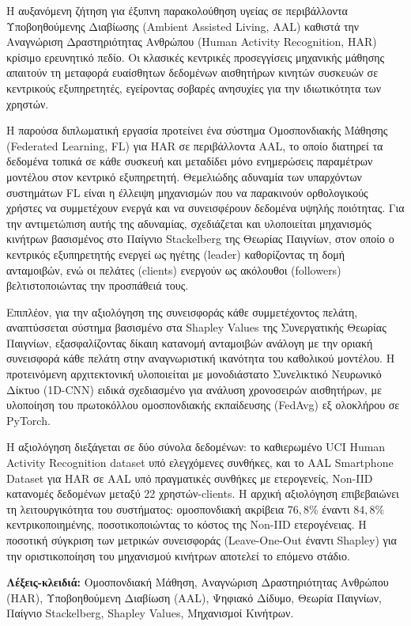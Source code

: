 
\noindent
Η αυξανόμενη ζήτηση για έξυπνη παρακολούθηση υγείας σε περιβάλλοντα
Υποβοηθούμενης Διαβίωσης (Ambient Assisted Living, AAL) καθιστά την
Αναγνώριση Δραστηριότητας Ανθρώπου (Human Activity Recognition, HAR)
κρίσιμο ερευνητικό πεδίο. Οι κλασικές κεντρικές προσεγγίσεις μηχανικής
μάθησης απαιτούν τη μεταφορά ευαίσθητων δεδομένων αισθητήρων κινητών
συσκευών σε κεντρικούς εξυπηρετητές, εγείροντας σοβαρές ανησυχίες για
την ιδιωτικότητα των χρηστών.

Η παρούσα διπλωματική εργασία προτείνει ένα σύστημα Ομοσπονδιακής
Μάθησης (Federated Learning, FL) για HAR σε περιβάλλοντα AAL, το οποίο
διατηρεί τα δεδομένα τοπικά σε κάθε συσκευή και μεταδίδει μόνο
ενημερώσεις παραμέτρων μοντέλου στον κεντρικό εξυπηρετητή. Θεμελιώδης
αδυναμία των υπαρχόντων συστημάτων FL είναι η έλλειψη μηχανισμών που
να παρακινούν ορθολογικούς χρήστες να συμμετέχουν ενεργά και να
συνεισφέρουν δεδομένα υψηλής ποιότητας. Για την αντιμετώπιση αυτής
της αδυναμίας, σχεδιάζεται και υλοποιείται μηχανισμός κινήτρων βασισμένος
στο Παίγνιο Stackelberg της Θεωρίας Παιγνίων, στον οποίο ο κεντρικός
εξυπηρετητής ενεργεί ως ηγέτης (leader) καθορίζοντας τη δομή ανταμοιβών,
ενώ οι πελάτες (clients) ενεργούν ως ακόλουθοι (followers) βελτιστοποιώντας
την προσπάθειά τους.

Επιπλέον, για την αξιολόγηση της συνεισφοράς κάθε συμμετέχοντος πελάτη,
αναπτύσσεται σύστημα βασισμένο στα Shapley Values της Συνεργατικής Θεωρίας
Παιγνίων, εξασφαλίζοντας δίκαιη κατανομή ανταμοιβών ανάλογη με την οριακή
συνεισφορά κάθε πελάτη στην αναγνωριστική ικανότητα του καθολικού μοντέλου.
Η προτεινόμενη αρχιτεκτονική υλοποιείται με μονοδιάστατο Συνελικτικό
Νευρωνικό Δίκτυο (1D-CNN) ειδικά σχεδιασμένο για ανάλυση χρονοσειρών
αισθητήρων, με υλοποίηση του πρωτοκόλλου ομοσπονδιακής εκπαίδευσης
(FedAvg) εξ ολοκλήρου σε PyTorch.

Η αξιολόγηση διεξάγεται σε δύο σύνολα δεδομένων: το καθιερωμένο UCI
Human Activity Recognition dataset υπό ελεγχόμενες συνθήκες, και το
AAL Smartphone Dataset για HAR σε AAL υπό
πραγματικές συνθήκες με ετερογενείς, Non-IID κατανομές δεδομένων μεταξύ
22 χρηστών-clients.
Η αρχική αξιολόγηση επιβεβαιώνει τη λειτουργικότητα του συστήματος:
ομοσπονδιακή ακρίβεια $76{,}8\%$ έναντι $84{,}8\%$ κεντρικοποιημένης,
ποσοτικοποιώντας το κόστος της Non-IID ετερογένειας. Η ποσοτική σύγκριση
των μετρικών συνεισφοράς (Leave-One-Out έναντι Shapley) για την
οριστικοποίηση του μηχανισμού κινήτρων αποτελεί το επόμενο στάδιο.

\vspace{1.5em}
\noindent
\textbf{Λέξεις-κλειδιά:}
Ομοσπονδιακή Μάθηση,
Αναγνώριση Δραστηριότητας Ανθρώπου (HAR),
Υποβοηθούμενη Διαβίωση (AAL),
Ψηφιακό Δίδυμο,
Θεωρία Παιγνίων,
Παίγνιο Stackelberg,
Shapley Values,
Μηχανισμοί Κινήτρων.
